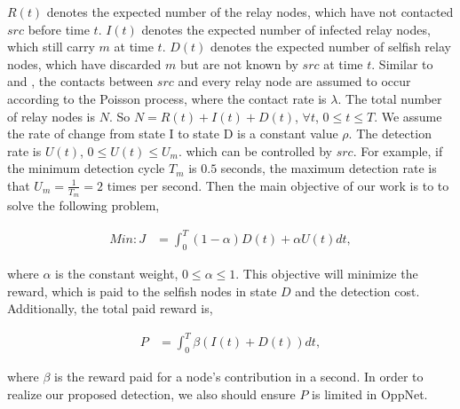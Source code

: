 $R(t)$ denotes the expected number of the relay nodes,
which have not contacted $src$ before time $t$.
$I(t)$ denotes the expected number of infected relay nodes,
which still carry $m$ at time $t$.
$D(t)$ denotes the expected number of selfish relay nodes,
which have discarded $m$ but are not known by $src$ at time $t$.
Similar to \cite{TCSS2018ControlM} and \cite{CC2007PerfAnaly},
the contacts between $src$ and every relay node
are assumed to occur according to the Poisson process,
where the contact rate is $\lambda$.
The total number of relay nodes is $N$.
So $N=R(t)+I(t)+D(t)$, $\forall t$, $0 \le t \le T$.
We assume the rate of change
from state I to state D is a constant value $\rho$.
The detection rate is $U(t)$,
$0 \le U(t) \le U_{m}$.
which can be controlled by $src$.
For example, if the minimum detection cycle $T_{m}$ is $0.5$ seconds,
the maximum detection rate is that $U_{m} = \frac{1}{T_{m}} = 2$
times per second.
Then the main objective of our work is to
to solve the following problem,
\begin{small}
\begin{equation}
\label{eq:obj}
\begin{aligned}
Min: J &= \int_{0}^{T} (1-\alpha) D(t) + \alpha U(t) dt ,
\end{aligned}
\end{equation}
\end{small}
where $\alpha$ is the constant weight, $0 \le \alpha \le 1$.
This objective will minimize the reward,
which is paid to the selfish nodes in state $D$
and the detection cost.
Additionally, the total paid reward is,
\begin{small}
\begin{equation}
\label{eq:reward}
\begin{aligned}
P &= \int_{0}^{T} \beta ( I(t) + D(t) )dt,
\end{aligned}
\end{equation}
\end{small}
where $\beta$ is the reward paid for 
a node's contribution in a second.
In order to realize our proposed detection,
we also should ensure $P$ is limited in OppNet.
